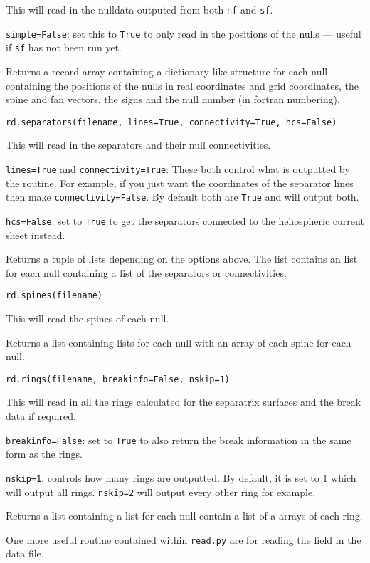 \documentclass[12pt]{article}
\begin{document}
      This will read in the nulldata outputed from both \texttt{nf} and \texttt{sf}.

      \texttt{simple=False}: set this to \texttt{True} to only read in the positions of the nulls --- useful if \texttt{sf} has not been run yet.

      Returns a record array containing a dictionary like structure for each null containing the positions of the nulls in real coordinates and grid coordinates, the spine and fan vectors, the signs and the null number (in fortran numbering).

      \texttt{rd.separators(filename, lines=True, connectivity=True, hcs=False)}

      This will read in the separators and their null connectivities.

      \texttt{lines=True} and \texttt{connectivity=True}: These both control what is outputted by the routine. For example, if you just want the coordinates of the separator lines then make \texttt{connectivity=False}. By default both are \texttt{True} and will output both.

      \texttt{hcs=False}: set to \texttt{True} to get the separators connected to the heliospheric current sheet instead.

      Returns a tuple of lists depending on the options above. The list contains an list for each null containing a list of the separators or connectivities.

      \texttt{rd.spines(filename)}

      This will read the spines of each null.

      Returns a list containing lists for each null with an array of each spine for each null.

      \texttt{rd.rings(filename, breakinfo=False, nskip=1)}

      This will read in all the rings calculated for the separatrix surfaces and the break data if required.

      \texttt{breakinfo=False}: set to \texttt{True} to also return the break information in the same form as the rings.

      \texttt{nskip=1}: controls how many rings are outputted. By default, it is set to 1 which will output all rings. \texttt{nskip=2} will output every other ring for example.

      Returns a list containing a list for each null contain a list of a arrays of each ring.

      One more useful routine contained within \texttt{read.py} are for reading the field in the data file.
\end{document}

